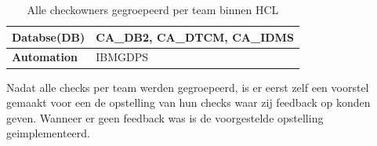 \begin{table}[]
\begin{tabular}{|l|p{9cm}|}
		\textbf{Databse(DB)}               & CA\_DB2, CA\_DTCM, CA\_IDMS                                                                                                                                            \\ \hline
		\textbf{Automation}                & IBMGDPS                                                                                                                                                                \\ \hline
	\end{tabular}
	\caption[Checks Per team]{Alle checkowners gegroepeerd per team binnen HCL}
	\label{tbl:Checks Per Team}
\end{table}

Nadat alle checks per team werden gegroepeerd, is er eerst zelf een voorstel gemaakt voor een de opstelling van hun checks waar zij feedback op konden geven. Wanneer er geen feedback was is de voorgestelde opstelling geimplementeerd.